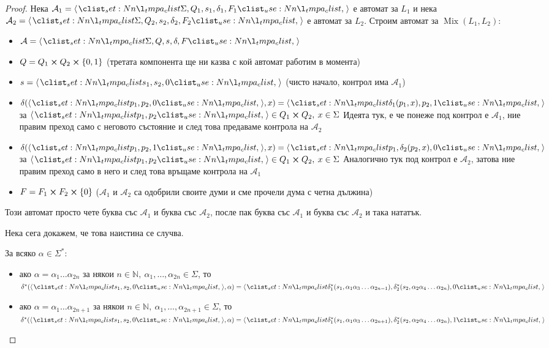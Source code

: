 \begin{proof}
    Нека $\mathcal{A}_1 = \opair{\Sigma, Q_1, s_1, \delta_1, F_1}$ е автомат за $L_1$ и нека $\mathcal{A}_2 = \opair{\Sigma, Q_2, s_2, \delta_2, F_2}$ е автомат за $L_2$.
    Строим автомат за $\operatorname{Mix}(L_1, L_2)$:
    \begin{itemize}
        \item $\mathcal{A} = \opair{\Sigma, Q, s, \delta, F}$
        \item $Q = Q_1 \cross Q_2 \cross \{ 0, 1 \}$ (третата компонента ще ни казва с кой автомат работим в момента)
        \item $s = \opair{s_1, s_2, 0}$ (чисто начало, контрол има $\mathcal{A}_1$)
        \item $\delta(\opair{p_1, p_2, 0}, x) = \opair{\delta_1(p_1, x), p_2, 1}$ за $\opair{p_1, p_2} \in Q_1 \cross Q_2, \: x \in \Sigma$
              Идеята тук, е че понеже под контрол е $\mathcal{A}_1$, ние правим преход само с неговото състояние и след това предаваме контрола на $\mathcal{A}_2$
        \item $\delta(\opair{p_1, p_2, 1}, x) = \opair{p_1, \delta_2(p_2, x), 0}$ за $\opair{p_1, p_2} \in Q_1 \cross Q_2, \: x \in \Sigma$
              Аналогично тук под контрол е $\mathcal{A}_2$, затова ние правим преход само в него и след това връщаме контрола на $\mathcal{A}_1$
        \item $F = F_1 \cross F_2 \cross \{ 0 \}$ ($\mathcal{A}_1$ и $\mathcal{A}_2$ са одобрили своите думи и сме прочели дума с четна дължина)
    \end{itemize}

    Този автомат просто чете буква със $\mathcal{A}_1$ и буква със $\mathcal{A}_2$, после пак буква със $\mathcal{A}_1$ и буква със $\mathcal{A}_2$ и така нататък.

    \pagebreak

    Нека сега докажем, че това наистина се случва.

    \begin{claim}
        За всяко $\alpha \in \Sigma^*$:
        \begin{itemize}
            \item ако $\alpha = \alpha_1 \dots \alpha_{2n}$ за някои $n \in \mathbb{N}, \: \alpha_1, \dots, \alpha_{2n} \in \Sigma$, то \\
                  $\delta^*(\opair{s_1, s_2, 0}, \alpha) = \opair{\delta_1^*(s_1, \alpha_1 \alpha_3 \dots \alpha_{2n - 1}), \delta_2^*(s_2, \alpha_2 \alpha_4 \dots \alpha_{2n}), 0}$
            \item ако $\alpha = \alpha_1 \dots \alpha_{2n + 1}$ за някои $n \in \mathbb{N}, \: \alpha_1, \dots, \alpha_{2n + 1} \in \Sigma$, то \\
                  $\delta^*(\opair{s_1, s_2, 0}, \alpha) = \opair{\delta_1^*(s_1, \alpha_1 \alpha_3 \dots \alpha_{2n + 1}), \delta_2^*(s_2, \alpha_2 \alpha_4 \dots \alpha_{2n}), 1}$
        \end{itemize}
    \end{claim}


\end{proof}
